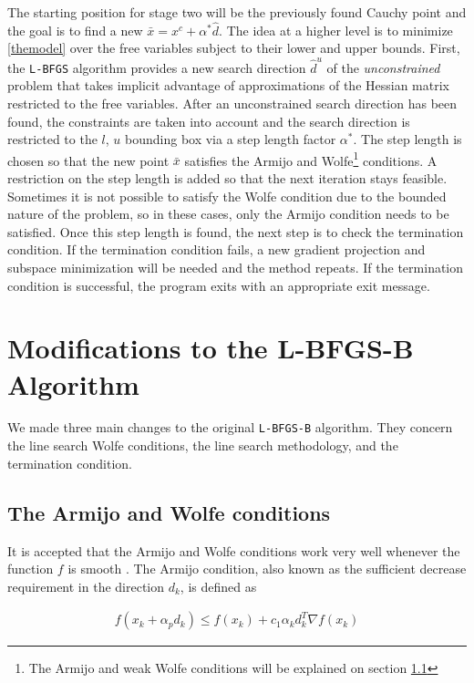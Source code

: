 The starting position for stage two will be the previously found Cauchy point and the goal is to find a new $\bar{x} = x^c + \alpha^* \hat{d}$. The idea at a higher level is to minimize \eqref{themodel} over the free variables subject to their lower and upper bounds. First, the \texttt{L-BFGS} algorithm provides a new search direction $\hat{d}^u$ of the \emph{unconstrained} problem that takes implicit advantage of approximations of the Hessian matrix restricted to the free variables. After an unconstrained search direction has been found, the constraints are taken into account and the search direction is restricted to the $l$, $u$ bounding box via a step length factor $\alpha^*$. The step length is chosen so that the new point $\bar{x}$ satisfies the Armijo and Wolfe\footnote{The Armijo and weak Wolfe conditions will be explained on section \ref{Wolfeconditions}} conditions. A restriction on the step length is added so that the next iteration stays feasible. Sometimes it is not possible to satisfy the Wolfe condition due to the bounded nature of the problem, so in these cases, only the Armijo condition needs to be satisfied. Once this step length is found, the next step is to check the termination condition. If the termination condition fails, a new gradient projection and subspace minimization will be needed and the method repeats. If the termination condition is successful, the program exits with an appropriate exit message.

\chapter{Modifications to the L-BFGS-B Algorithm}

We made three main changes to the original \texttt{L-BFGS-B} algorithm. They concern the line search Wolfe conditions, the line search methodology, and the termination condition.

\section{The Armijo and Wolfe conditions} \label{Wolfeconditions}

It is accepted that the Armijo and Wolfe conditions work very well whenever the function $f$ is smooth \citep{MR1855221}. The Armijo condition, also known as the sufficient decrease requirement in the direction $d_k$, is defined as

\begin{equation} \label{armijocondition}
  \begin{aligned}
    f(x_k + \alpha_p d_k) \leq f(x_k) + c_1 \alpha_k d_k^T \nabla f(x_k)
  \end{aligned}
\end{equation}

